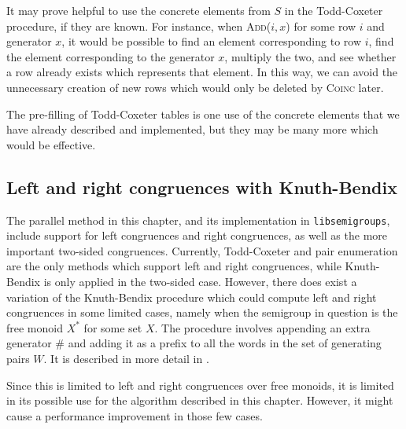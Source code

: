 It may prove helpful to use the concrete elements from $S$ in the Todd-Coxeter
procedure, if they are known.  For instance, when \textsc{Add($i, x$)} for some
row $i$ and generator $x$, it would be possible to find an element corresponding
to row $i$, find the element corresponding to the generator $x$, multiply the
two, and see whether a row already exists which represents that element.  In
this way, we can avoid the unnecessary creation of new rows which would only be
deleted by \textsc{Coinc} later.

The pre-filling of Todd-Coxeter tables is one use of the concrete elements that
we have already described and implemented, but they may be many more which would
be effective.

\subsection{Left and right congruences with Knuth-Bendix}
\label{sec:kb-l-r}
The parallel method in this chapter, and its implementation in
\texttt{libsemigroups}, include support for left congruences and right
congruences, as well as the more important two-sided congruences.  Currently,
Todd-Coxeter and pair enumeration are the only methods which support left and
right congruences, while Knuth-Bendix is only applied in the two-sided case.
However, there does exist a variation of the Knuth-Bendix procedure which could
compute left and right congruences in some limited cases, namely when the
semigroup in question is the free monoid $X^*$ for some set $X$.  The procedure
involves appending an extra generator $\#$ and adding it as a prefix to all the
words in the set of generating pairs $W$.  It is described in more detail in
\cite[\S 2.8]{sims}.

Since this is limited to left and right congruences over free monoids, it is
limited in its possible use for the algorithm described in this chapter.
However, it might cause a performance improvement in those few cases.


\clearpage
